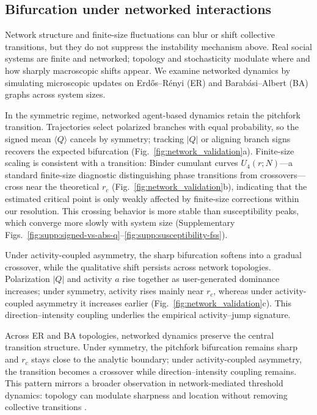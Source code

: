 \documentclass[preprint,12pt]{elsarticle}
\begin{document}
\subsection{Bifurcation under networked interactions}
\label{sec:network-validation}
Network structure and finite-size fluctuations can blur or shift collective transitions, but they do not suppress the instability mechanism above. Real social systems are finite and networked; topology and stochasticity modulate where and how sharply macroscopic shifts appear. We examine networked dynamics by simulating microscopic updates on Erd\H{o}s--R\'enyi (ER) and Barab\'asi--Albert (BA) graphs across system sizes.

In the symmetric regime, networked agent-based dynamics retain the pitchfork transition. Trajectories select polarized branches with equal probability, so the signed mean $\langle Q\rangle$ cancels by symmetry; tracking $|Q|$ or aligning branch signs recovers the expected bifurcation (Fig.~\ref{fig:network_validation}a). Finite-size scaling is consistent with a transition: Binder cumulant curves $U_4(r;N)$---a standard finite-size diagnostic distinguishing phase transitions from crossovers---cross near the theoretical $r_c$ (Fig.~\ref{fig:network_validation}b), indicating that the estimated critical point is only weakly affected by finite-size corrections within our resolution. This crossing behavior is more stable than susceptibility peaks, which converge more slowly with system size (Supplementary Figs.~\ref{fig:supp:signed-vs-abs-q}--\ref{fig:supp:susceptibility-fss}).

Under activity-coupled asymmetry, the sharp bifurcation softens into a gradual crossover, while the qualitative shift persists across network topologies. Polarization $|Q|$ and activity $a$ rise together as user-generated dominance increases; under symmetry, activity rises mainly near $r_c$, whereas under activity-coupled asymmetry it increases earlier (Fig.~\ref{fig:network_validation}c). This direction--intensity coupling underlies the empirical activity--jump signature.

Across ER and BA topologies, networked dynamics preserve the central transition structure. Under symmetry, the pitchfork bifurcation remains sharp and $r_c$ stays close to the analytic boundary; under activity-coupled asymmetry, the transition becomes a crossover while direction--intensity coupling remains. This pattern mirrors a broader observation in network-mediated threshold dynamics: topology can modulate sharpness and location without removing collective transitions \cite{Watts2002,Centola2010,Centola2018Tipping,Iacopini2019}.
\end{document}
